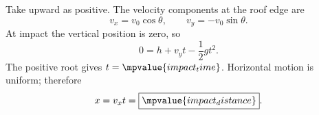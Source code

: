 Take upward as positive. The velocity components at the roof edge are
\[
  v_x=v_0\cos\theta,
  \qquad
  v_y=-v_0\sin\theta.
\]
At impact the vertical position is zero, so
\[
  0=h+v_y t-\frac12gt^2.
\]
The positive root gives $t=\mpvalue{impact_time}$. Horizontal motion is uniform; therefore
\[
  x=v_xt=\boxed{\mpvalue{impact_distance}}.
\]
